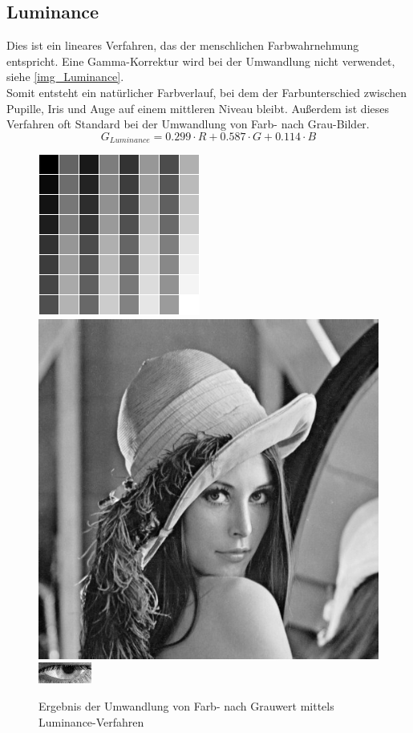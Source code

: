 \subsection{Luminance}
\label{gray_Luminance}
Dies ist ein lineares Verfahren, das der menschlichen Farbwahrnehmung entspricht. Eine Gamma-Korrektur wird bei der Umwandlung nicht verwendet, siehe \autoref{img_Luminance}.\\
Somit entsteht ein natürlicher Farbverlauf, bei dem der Farbunterschied zwischen Pupille, Iris und Auge auf einem mittleren Niveau bleibt. Außerdem ist dieses Verfahren oft Standard bei der Umwandlung von Farb- nach Grau-Bilder.
\[G_{Luminance} = 0.299 \cdot R + 0.587 \cdot G + 0.114 \cdot B\]
\begin{figure}
	\centering
	\includegraphics[width=0.2\linewidth]{img/Farbkarte_Normal}
	\includegraphics[width=0.2\linewidth]{img/Lena_Normal}
	\includegraphics[width=0.2\linewidth]{img/Auge_NormGray}
	\caption{Ergebnis der Umwandlung von Farb- nach Grauwert mittels Luminance-Verfahren}
	\label{img_Luminance}
\end{figure}
